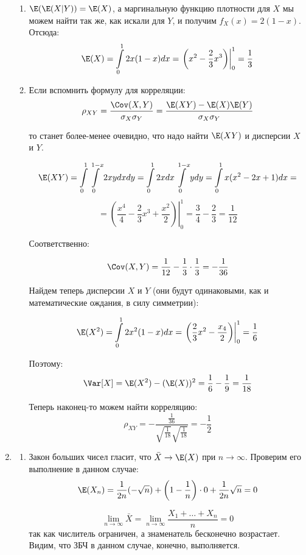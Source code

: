 \begin{enumerate}
\begin{enumerate}
\item $\E(\E(X|Y)) = \E(X)$, а маргинальную функцию плотности для $X$ мы можем найти так же, как искали для $Y$, и получим $f_X(x) = 2(1-x)$. Отсюда:
\[
\E(X) = \int \limits_{0}^{1} 2x(1-x)dx = \left .\left(x^2 - \frac{2}{3}x^3\right) \right|^{1}_{0} = \frac{1}{3}
\]

\item Если вспомнить формулу для корреляции:
\[
\rho_{XY} = \frac{\Cov(X, Y)}{\sigma_X\sigma_Y}  = \frac{\E(XY) - \E(X)\E(Y)}{\sigma_X\sigma_Y}
\]

то станет более-менее очевидно, что надо найти $\E(XY)$ и дисперсии $X$ и $Y$.

\[
\E(XY) = \int \limits_{0}^{1} \int \limits_{0}^{1-x} 2xy dxdy = \int \limits_{0}^{1} 2xdx \int \limits_{0}^{1-x}ydy =  \int \limits_{0}^{1}x(x^2-2x+1)dx =
\]
\[
= \left. \left(\frac{x^4}{4} - \frac{2}{3}x^3 + \frac{x^2}{2}\right) \right|^{1}_{0} = \frac{3}{4}-\frac{2}{3} = \frac{1}{12}
\]

Соответственно:

\[
\Cov(X, Y) = \frac{1}{12} - \frac{1}{3}\cdot \frac{1}{3} = -\frac{1}{36}
\]

Найдем теперь дисперсии $X$ и $Y$ (они будут одинаковыми, как и математические ождания, в силу симметрии):

\[
\E(X^2) = \int \limits_{0}^{1} 2x^2(1-x)dx = \left. \left( \frac{2}{3}x^2 - \frac{x_4}{2} \right) \right|_{0}^{1} = \frac{1}{6}
\]

Поэтому:
\[
\Var[X] = \E(X^2) - (\E(X))^2 = \frac{1}{6} - \frac{1}{9} = \frac{1}{18}
\]

Теперь наконец-то можем найти корреляцию:
\[
\rho_{XY} = -\frac{\frac{1}{36}}{\sqrt{\frac{1}{18}}\sqrt{\frac{1}{18}}} = -\frac{1}{2}
\]
\end{enumerate}

\item

\begin{enumerate}

\item Закон больших чисел гласит, что $\bar{X} \rightarrow
\E(X)$ при $n\rightarrow \infty$. Проверим его выполнение в данном случае:
\[
\E(X_n) = \frac{1}{2n}(-\sqrt{n}) + \left(1-\frac{1}{n}\right)\cdot0 + \frac{1}{2n}\sqrt{n} = 0
\]

\[
\lim\limits_{n\rightarrow\infty} \bar{X} = \lim\limits_{n\rightarrow\infty} \frac{X_1 +\dots + X_n}{n} = 0
\]
так как числитель ограничен, а знаменатель бесконечно возрастает.
Видим, что ЗБЧ в данном случае, конечно, выполняется.


\end{enumerate}
\end{enumerate}
